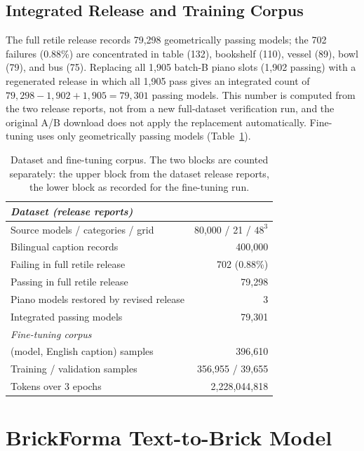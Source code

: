 \documentclass[letterpaper]{article} %
\begin{document}
\subsection{Integrated Release and Training Corpus}
The full retile release records 79,298 geometrically passing models; the 702 failures (0.88\%) are concentrated in table (132), bookshelf (110), vessel (89), bowl (79), and bus (75). Replacing all 1,905 batch-B piano slots (1,902 passing) with a regenerated release in which all 1,905 pass gives an integrated count of $79{,}298-1{,}902+1{,}905=79{,}301$ passing models. This number is computed from the two release reports, not from a new full-dataset verification run, and the original A/B download does not apply the replacement automatically. Fine-tuning uses only geometrically passing models (Table~\ref{tab:training-data}).

\begin{table}[t]
\centering
\small
\setlength{\tabcolsep}{4pt}
\begin{tabular}{lr}
\toprule
\multicolumn{2}{l}{\emph{Dataset (release reports)}} \\
\midrule
Source models / categories / grid & 80,000 / 21 / $48^3$ \\
Bilingual caption records & 400,000 \\
Failing in full retile release & 702 (0.88\%) \\
Passing in full retile release & 79,298 \\
Piano models restored by revised release & 3 \\
Integrated passing models & 79,301 \\
\midrule
\multicolumn{2}{l}{\emph{Fine-tuning corpus}} \\
\midrule
(model, English caption) samples & 396,610 \\ %
Training / validation samples & 356,955 / 39,655 \\
Tokens over 3 epochs & 2,228,044,818 \\ %
\bottomrule
\end{tabular}
\caption{Dataset and fine-tuning corpus. The two blocks are counted separately: the upper block from the dataset release reports, the lower block as recorded for the fine-tuning run.}
\label{tab:training-data}
\end{table}

\section{BrickForma Text-to-Brick Model}
\label{sec:model}
\end{document}
